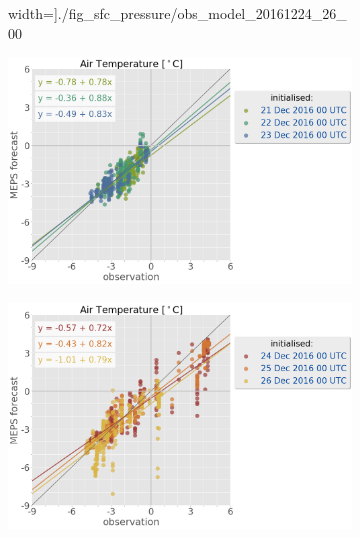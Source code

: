 \begin{figure}[h!]
\begin{subfigure}[b]{0.49\textwidth}
    width=\textwidth]{./fig_sfc_pressure/obs_model_20161224_26_00}
    	\caption{}\label{fig:scat:pres2426}
    \end{subfigure}
     \begin{subfigure}[b]{0.49\textwidth}
     	\includegraphics[trim={0.cm 0cm 12.5cm 0cm},clip,
    width=\textwidth]{./fig_sfc_temp/obs_model_20161221_23_00}
     	\caption{}\label{fig:scat:temp2123}
     \end{subfigure}
	\begin{subfigure}[b]{0.49\textwidth}
     	\includegraphics[trim={0.cm 0cm 12.5cm 0cm},clip,
    width=\textwidth]{./fig_sfc_temp/obs_model_20161224_26_00}
     	\caption{}\label{fig:scat:temp2426}
     \end{subfigure}
     

\end{figure}
